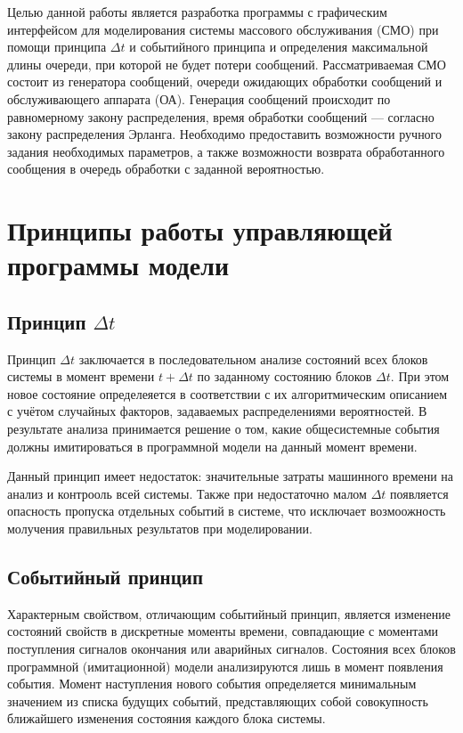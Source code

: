  Целью данной работы является разработка программы с графическим интерфейсом для моделирования системы массового обслуживания (СМО) при помощи принципа $\Delta t$ и событийного принципа и определения максимальной длины очереди, при которой не будет потери сообщений. Рассматриваемая СМО состоит из генератора сообщений, очереди ожидающих обработки сообщений и обслуживающего аппарата (ОА). Генерация сообщений происходит по равномерному закону распределения, время обработки сообщений --- согласно закону распределения Эрланга. Необходимо предоставить возможности ручного задания необходимых параметров, а также возможности возврата обработанного сообщения в очередь обработки с заданной вероятностью.
 
\section*{Принципы работы управляющей программы модели}

\subsection*{Принцип $\Delta t$}

Принцип $\Delta t$ заключается в последовательном анализе состояний всех блоков системы в момент времени $t + \Delta t$ по заданному состоянию блоков $\Delta t$.
 При этом новое состояние определеяется в соответствии с их алгоритмическим описанием с учётом случайных факторов, задаваемых распределениями вероятностей. 
В результате анализа принимается решение о том, какие общесистемные события должны имитироваться в программной модели на данный момент времени.

Данный принцип имеет недостаток: значительные затраты машинного времени на анализ и контрооль всей системы.
Также при недостаточно малом  $\Delta t$ появляется опасность пропуска отдельных событий в системе, что исключает возмоожность молучения правильных результатов при моделировании.

\subsection*{Событийный принцип}

Характерным свойством, отличающим событийный принцип, является изменение состояний свойств в дискретные моменты времени, совпадающие с моментами поступления сигналов окончания или аварийных сигналов. 
Состояния всех блоков программной (имитационной) модели анализируются лишь в момент появления события.
Момент наступления нового события определяется минимальным значением из списка будущих событий, представляющих собой совокупность ближайшего изменения состояния каждого блока системы.

